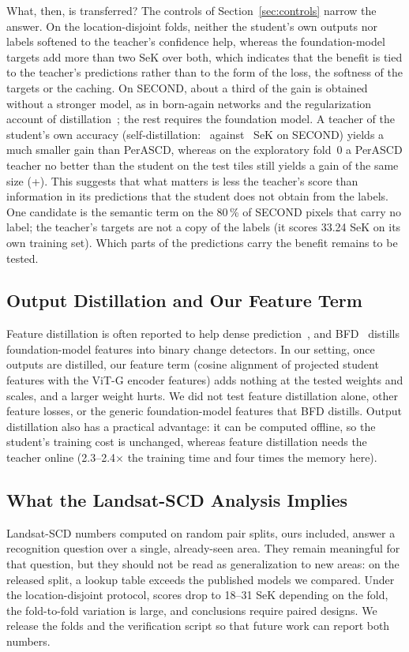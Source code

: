 \documentclass[journal]{IEEEtran}
\begin{document}
What, then, is transferred? The controls of Section~\ref{sec:controls} narrow the answer. On the
location-disjoint folds, neither the student's own outputs nor labels softened to the teacher's
confidence help, whereas the foundation-model targets add more than two SeK over both, which indicates that the
benefit is tied to the teacher's predictions rather than to the form of the loss, the softness of
the targets or the caching. On SECOND, about a third of the gain is obtained without a stronger
model, as in born-again networks and the regularization account of
distillation~\cite{furlanello2018born,yuan2020revisiting,muller2019label}; the rest requires the
foundation model. A teacher of the student's own accuracy (self-distillation: \RevSelfTeacherSec\
against \SecBaseSek\ SeK on SECOND) yields a much smaller gain than PerASCD, whereas on the exploratory
fold~0 a PerASCD teacher no better than the student on the test tiles still yields a gain of the same size
(+\FZeroGain). This
suggests that what matters is less the teacher's score than information in its predictions that the
student does not obtain from the labels. One candidate is the semantic term on the 80\,\% of SECOND pixels
that carry no label; the teacher's targets are not a copy of the labels (it scores 33.24 SeK on its
own training set). Which parts of the predictions carry the benefit remains to be tested.

\subsection{Output Distillation and Our Feature Term}
Feature distillation is often reported to help dense prediction~\cite{liu2019structured,
shu2021channel}, and BFD~\cite{wang2025burden} distills foundation-model features into binary
change detectors. In our setting, once outputs are distilled, our feature term (cosine alignment of projected
student features with the ViT-G encoder features) adds nothing at the tested weights and scales,
and a larger weight hurts. We did not test feature distillation alone, other feature losses, or
the generic foundation-model features that BFD distills. Output distillation also has a practical advantage: it can be
computed offline, so the student's training cost is unchanged, whereas feature distillation
needs the teacher online (2.3--2.4$\times$ the training time and four times the memory here).

\subsection{What the Landsat-SCD Analysis Implies}
Landsat-SCD numbers computed on random pair splits, ours included, answer a recognition question
over a single, already-seen area. They remain meaningful for that question, but they should not be
read as generalization to new areas: on the released split, a lookup table exceeds the published
models we compared. Under the location-disjoint protocol, scores drop to 18--31 SeK depending on the
fold, the fold-to-fold variation is large, and conclusions require paired designs. We release
the folds and the verification script so that future work can report both numbers.
\end{document}
